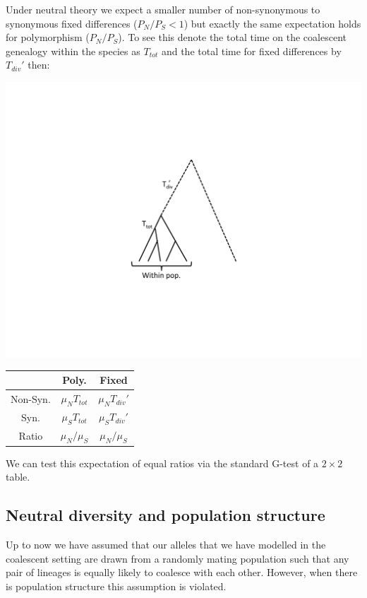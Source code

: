 Under neutral theory we expect a smaller number of non-synonymous to
synonymous fixed differences ($P_N/P_S < 1$) but exactly the same
expectation holds for polymorphism
($P_N/P_S$). To see this denote the total time on the coalescent genealogy within the species as
$T_{tot}$ and the total time for fixed differences by $T_{div}'$ then:
\begin{marginfigure}
\begin{center}
\includegraphics{figures/Coalescent/MK_tree.pdf} 
\end{center}
\caption{ } \label{fig:MK_tree}
\end{marginfigure}
\begin{center}
\begin{tabular}{ccc}
 & Poly. & Fixed  \\
 \hline
Non-Syn. &    $\mu_N T_{tot}$  &   $\mu_N  T_{div}'$ \\
Syn. &    $\mu_S T_{tot}$   &     $\mu_S  T_{div}'$  \\
Ratio & $\mu_N/\mu_S$  & $\mu_N/\mu_S$
\end{tabular}
\end{center}
We can test this expectation of equal ratios via the standard G-test of a $2
\times 2$ table.

\subsection{Neutral diversity and population structure}
Up to now we have assumed that our alleles that we have modelled in the
coalescent setting are drawn from a randomly mating population such
that any pair of lineages is equally likely to coalesce with each
other. However, when there is population structure this assumption is
violated. \\


